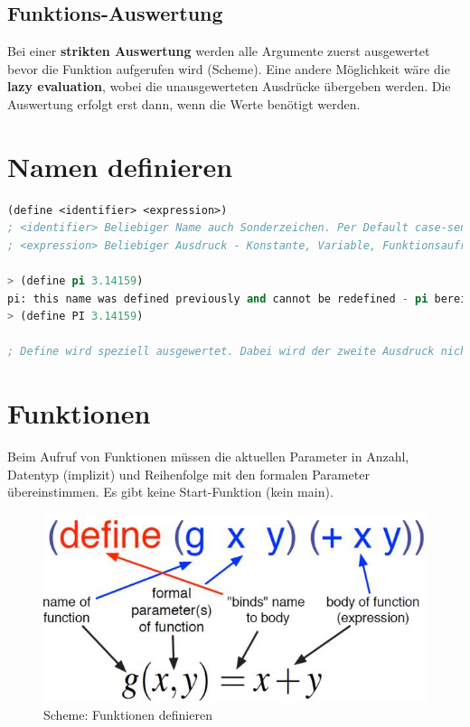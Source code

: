 \subsection{Funktions-Auswertung}
Bei einer \textbf{strikten Auswertung} werden alle Argumente zuerst ausgewertet bevor die Funktion aufgerufen wird (Scheme). Eine andere Möglichkeit wäre die \textbf{lazy evaluation}, wobei die unausgewerteten Ausdrücke übergeben werden. Die Auswertung erfolgt erst dann, wenn die Werte benötigt werden.

\section{Namen definieren}
\begin{lstlisting}[language=Lisp, caption=Namen definieren]
(define <identifier> <expression>)
; <identifier> Beliebiger Name auch Sonderzeichen. Per Default case-sensitive, in DrRacket ausschaltbar.
; <expression> Beliebiger Ausdruck - Konstante, Variable, Funktionsaufruf, ...

> (define pi 3.14159)
pi: this name was defined previously and cannot be redefined - pi bereits eine Scheme Konstante
> (define PI 3.14159)

; Define wird speziell ausgewertet. Dabei wird der zweite Ausdruck nicht ausgewertet (im Beispiel pi). Zudem ist der Rückgabewerte von define nicht spezifiziert.
\end{lstlisting}

\newpage

\section{Funktionen}
Beim Aufruf von Funktionen müssen die aktuellen Parameter in Anzahl, Datentyp (implizit) und Reihenfolge mit den formalen Parameter übereinstimmen. Es gibt keine Start-Funktion (kein main).

\begin{figure}[h!]
\centering
\includegraphics[width=0.5\linewidth]{fig/scheme-function-definition}
\caption{Scheme: Funktionen definieren}
\label{fig:scheme-function-definition}
\end{figure}

